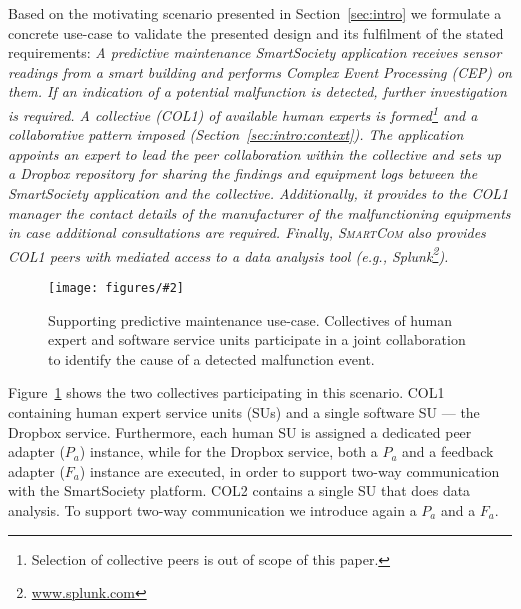 \documentclass{llncs}
\newcommand{\mdl}{\textsc{SmartCom}}
\newcommand{\figfloat}[3][0.9]{
\begin{figure}[h] 
\centering
\texttt{[image: figures/\#2]}
\caption{#3}
\label{fig:#2}
\end{figure}
}
\begin{document}
	Based on the motivating scenario presented in Section~\ref{sec:intro} we formulate a concrete use-case to validate the presented design and its fulfilment of the stated requirements:
	\emph{A predictive maintenance SmartSociety application receives sensor readings from a smart building and performs Complex Event Processing (CEP) on them. If an indication of a potential malfunction is detected, further investigation is required. A collective (COL1) of available human experts is formed\footnote{Selection of collective peers is out of scope of this paper.} and a collaborative pattern imposed (Section~\ref{sec:intro:context}). The application appoints an expert to lead the peer collaboration within the collective and sets up a Dropbox repository for sharing the findings and equipment logs between the SmartSociety application and the collective. Additionally, it provides to the COL1 manager the contact details of the manufacturer of the malfunctioning equipments in case additional consultations are required. Finally, \mdl{} also provides COL1 peers with mediated access to a data analysis tool (e.g., Splunk\footnote{\url{www.splunk.com}}).}

	\figfloat[.8]{use-case}{Supporting predictive maintenance use-case. Collectives of human expert and software service units participate in a joint collaboration to identify the cause of a detected malfunction event.}

	Figure~\ref{fig:use-case} shows the two collectives participating in this scenario. COL1 containing human expert service units (SUs) and a single software SU --- the Dropbox service. Furthermore, each human SU is assigned a dedicated peer adapter ($P_a$) instance, while for the Dropbox service, both a $P_a$ and a feedback adapter ($F_a$) instance are executed, in order to support two-way communication with the SmartSociety platform. COL2 contains a single SU that does data analysis. To support two-way communication we introduce again a $P_a$ and a $F_a$.
\end{document}
